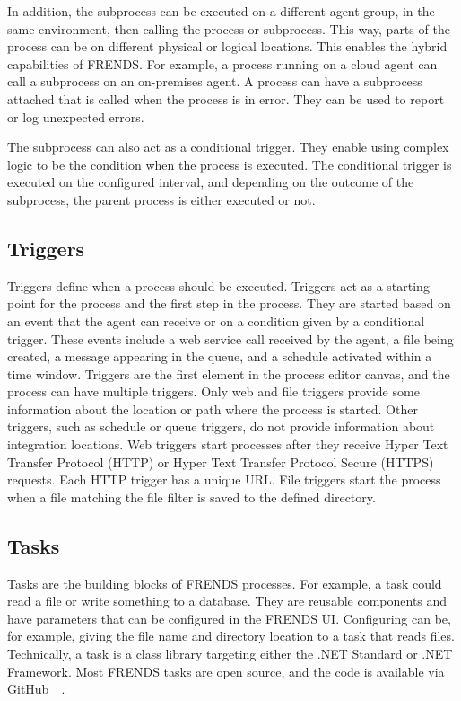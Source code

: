 \documentclass[english, 12pt, a4paper, sci, utf8, a-2b, online, obeyspaces]{aaltothesis}
\begin{document}
In addition, the subprocess can be executed on a different agent group, in the same environment, then calling the process or subprocess. This way, parts of the process can be on different physical or logical locations. This enables the hybrid capabilities of FRENDS. For example, a process running on a cloud agent can call a subprocess on an on-premises agent. A process can have a subprocess attached that is called when the process is in error. They can be used to report or log unexpected errors.

The subprocess can also act as a conditional trigger. They enable using complex logic to be the condition when the process is executed. The conditional trigger is executed on the configured interval, and depending on the outcome of the subprocess, the parent process is either executed or not.

\subsection{Triggers}
Triggers define when a process should be executed. Triggers act as a starting point for the process and the first step in the process. They are started based on an event that the agent can receive or on a condition given by a conditional trigger. These events include a web service call received by the agent, a file being created, a message appearing in the queue, and a schedule activated within a time window. Triggers are the first element in the process editor canvas, and the process can have multiple triggers. Only web and file triggers provide some information about the location or path where the process is started. Other triggers, such as schedule or queue triggers, do not provide information about integration locations. Web triggers start processes after they receive Hyper Text Transfer Protocol (HTTP) or Hyper Text Transfer Protocol Secure (HTTPS) requests. Each HTTP trigger has a unique URL. File triggers start the process when a file matching the file filter is saved to the defined directory. 

\subsection{Tasks}
\label{sec:tasks}
Tasks are the building blocks of FRENDS processes. For example, a task could read a file or write something to a database. They are reusable components and have parameters that can be configured in the FRENDS UI. Configuring can be, for example, giving the file name and directory location to a task that reads files. Technically, a task is a class library targeting either the .NET Standard or .NET Framework. Most FRENDS tasks are open source, and the code is available via GitHub~\cite{community2018}~\cite{hiq2018frendstasks}.
\end{document}

